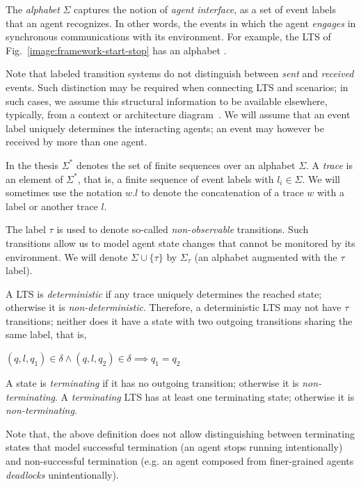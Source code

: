 The \emph{alphabet} $\Sigma$ captures the notion of \emph{agent interface}, as a set of event labels that an agent recognizes. In other words, the events in which the agent \emph{engages} in synchronous communications with its environment. For example, the LTS of Fig.~\ref{image:framework-start-stop} has an alphabet . 

Note that labeled transition systems do not distinguish between \emph{sent} and \emph{received} events. Such distinction may be required when connecting LTS and scenarios; in such cases, we assume this structural information to be available elsewhere, typically, from a context or architecture diagram~\cite{Ward:1985, Magee:1995}. We will assume that an event label uniquely determines the interacting agents; an event may however be received by more than one agent. 

In the thesis $\Sigma^{*}$ denotes the set of finite sequences over an alphabet $\Sigma$. A \emph{trace} is an element of $\Sigma^{*}$, that is, a finite sequence of event labels  with $l_i \in \Sigma$. We will sometimes use the notation $w.l$ to denote the concatenation of a trace $w$ with a label or another trace $l$.

The label $\tau$ is used to denote so-called \emph{non-observable} transitions. Such transitions allow us to model agent state changes that cannot be monitored by its environment. We will denote $\Sigma\cup\{\tau\}$ by $\Sigma_{\tau}$ (an alphabet augmented with the $\tau$ label).

A LTS is \emph{deterministic} if any trace uniquely determines the reached state; otherwise it is \emph{non-deterministic}. Therefore, a deterministic LTS may not have $\tau$ transitions; neither does it have a state with two outgoing transitions sharing the same label, that is, 

\begin{center}$(q,l,q_1) \in \delta \wedge (q,l,q_2) \in \delta \implies q_1 = q_2$\end{center}

A state is \emph{terminating} if it has no outgoing transition; otherwise it is \emph{non-terminating}. A \emph{terminating} LTS has at least one terminating state; otherwise it is \emph{non-terminating}. 

Note that, the above definition does not allow distinguishing between terminating states that model successful termination (an agent stops running intentionally) and non-successful termination (e.g. an agent composed from finer-grained agents \emph{deadlocks} unintentionally). 

